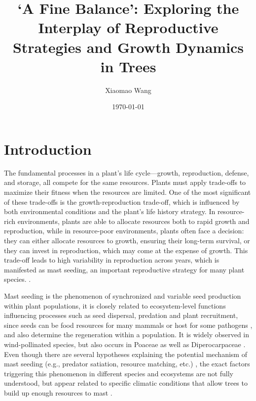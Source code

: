 \documentclass[11pt,letter]{article}
\begin{document}
\title{`A Fine Balance': Exploring the Interplay of Reproductive Strategies and Growth Dynamics in Trees}
\author{Xiaomao Wang} 
\date{\today}
\maketitle

\setlength{\parindent}{0pt}
\setlength{\parskip}{3pt}

\section{Introduction} 
The fundamental processes in a plant's life cycle—growth, reproduction, defense, and storage, all compete for the same resources. Plants must apply trade-offs to maximize their fitness when the resources are limited. One of the most significant of these trade-offs is the growth-reproduction trade-off, which is influenced by both environmental conditions and the plant's life history strategy. In resource-rich environments, plants are able to allocate resources both to rapid growth and reproduction, while in resource-poor environments, plants often face a decision: they can either allocate resources to growth, ensuring their long-term survival, or they can invest in reproduction, which may come at the expense of growth. This trade-off leads to high variability in reproduction across years, which is manifested as mast seeding, an important reproductive strategy for many plant species. \citep{pearse2016mechanisms}.\par
Mast seeding is the phenomenon of synchronized and variable seed production within plant populations, it is closely related to ecosystem-level functions influencing processes such as seed dispersal, predation and plant recruitment, since seeds can be food resources for many mammals or host for some pathogens  \citep{janzen1971seed, kelly1994evolutionary, davies2024seed}, and also determine the regeneration within a population. It is widely observed in wind-pollinated species, but also occurs in Poaceae as well as Diperocarpaceae \citep{kelly2002mast}. Even though there are several hypotheses explaining the potential mechanism of mast seeding (e.g., predator satiation, resource matching, etc.)  \citep{koenig2021brief}, the exact factors triggering this phenomenon in different species and ecosystems are not fully understood, but appear related to specific climatic conditions that allow trees to build up enough resources to mast  \citep{pearse2016mechanisms}. \par
\end{document}
